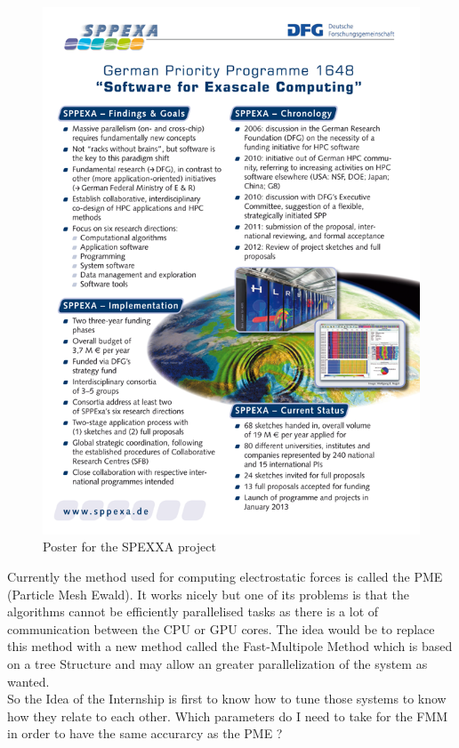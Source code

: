 \documentclass[12pt,twoside,a4paper]{report}
\begin{document}
\begin{figure}[H]
\includegraphics[scale=2]{sppexa-poster}
 \centering 
\caption{Poster for the SPEXXA project}
\label{fig:poster}
\end{figure}


Currently the method used for computing electrostatic forces is called the PME (Particle Mesh Ewald). It works nicely but one of its problems is that the algorithms cannot be efficiently parallelised tasks as there is a lot of communication between the CPU or GPU cores. The idea would be to replace this method with a new method called the Fast-Multipole Method which is based on a tree Structure and may allow an greater parallelization of the system as wanted.\\

So the Idea of the Internship is first to know how to tune those systems to know how they relate to each other. Which parameters do I need to take for the FMM in order to have the same accurarcy as the PME ?
\end{document}
